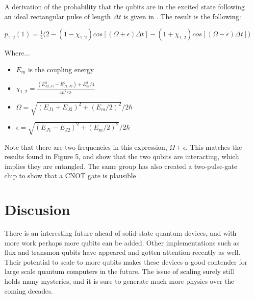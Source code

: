 \documentclass[12pt,letterpaper,notitlepage]{report}
\begin{document}
A derivation of the probability that the qubits are in the excited state following an ideal rectangular pulse of length $\Delta t$ is given in \cite{onePulseGateNature}. The result is the following:

$p_{1,2}(1)=\frac{1}{4} \Bigg ( 2-(1-\chi_{1,2})cos[(\Omega+\epsilon)\Delta t]-(1+\chi_{1,2})cos[(\Omega-\epsilon)\Delta t] \Bigg )$

Where...
\begin{itemize}
    \item $E_m$ is the coupling energy
    \item $\chi_{1,2}=\frac{(E^2_{J2,J1}-E^2_{J1,J2})+E^2_m/4}{4\hbar^2\Omega\epsilon}$
    \item $\Omega = \sqrt{(E_{J1}+E_{J2})^2+(E_m/2)^2}/2\hbar$
    \item $\epsilon = \sqrt{(E_{J1}-E_{J2})^2+(E_m/2)^2}/2\hbar$
\end{itemize}

Note that there are two frequencies in this expression, $\Omega \pm \epsilon$. This matches the results found in Figure 5, and show that the two qubits are interacting, which implies they are entangled. The same group has also created a two-pulse-gate chip to show that a CNOT gate is plausible \cite{twoPulseGates}.



%
%

\section*{Discusion}

There is an interesting future ahead of solid-state quantum devices, and with more work perhaps more qubits can be added. Other implementations such as flux and transmon qubits have appeared and gotten attention recently as well. Their potential to scale to more qubits makes these devices a good contender for large scale quantum computers in the future. The issue of scaling surely still holds many mysteries, and it is sure to generate much more physics over the coming decades.



\end{document}
